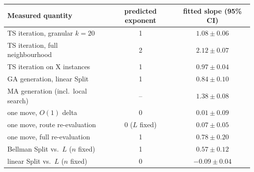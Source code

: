 \begin{tabular}{lcc}
\toprule
Measured quantity & predicted exponent & fitted slope (95\% CI) \\
\midrule
TS iteration, granular $k=20$ & 1 & $1.08\pm0.06$ \\
TS iteration, full neighbourhood & 2 & $2.12\pm0.07$ \\
TS iteration on X instances & 1 & $0.97\pm0.04$ \\
GA generation, linear Split & 1 & $0.84\pm0.10$ \\
MA generation (incl.\ local search) & -- & $1.38\pm0.08$ \\
one move, $O(1)$ delta & 0 & $0.01\pm0.09$ \\
one move, route re-evaluation & 0 ($L$ fixed) & $0.07\pm0.05$ \\
one move, full re-evaluation & 1 & $0.78\pm0.20$ \\
Bellman Split vs.\ $L$ ($n$ fixed) & 1 & $0.57\pm0.12$ \\
linear Split vs.\ $L$ ($n$ fixed) & 0 & $-0.09\pm0.04$ \\
\bottomrule
\end{tabular}
